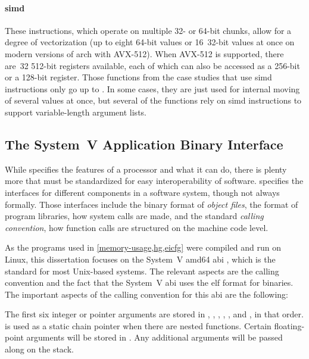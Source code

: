 \paragraph{\Acf{simd}}
These instructions, which operate on multiple 32- or 64-bit chunks,
allow for a degree of vectorization (up to eight 64-bit values
or 16~32-bit values at once on modern versions of \gls{arch} with AVX-512).
When AVX-512 is supported, there are~32 512-bit  registers available,
each of which can also be accessed as a 256-bit 
or a 128-bit  register.
Those functions from the case studies that use \ac{simd} instructions
only go up to . In some cases, they are just used for internal moving
of several values at once, but several of the functions rely on \ac{simd} instructions
to support variable-length argument lists.

\subsection{The System~V  Application Binary Interface}
While  specifies the features of a processor and what it can do,
there is plenty more that must be standardized for easy interoperability of
software.  specifies the interfaces for different components
in a software system, though not always formally. Those interfaces include
the binary format of \emph{object files}, the format of program libraries,
how system calls are made, and the standard \emph{calling convention},
how function calls are structured on the machine code level.

As the programs used in \cref{memory-usage,hg,eicfg} were compiled and run on Linux,
this dissertation focuses on the System~V \gls{amd64} \ac{abi} \autocite{systemv-ABI-git},
which is the standard for most Unix-based systems.
The relevant aspects are the calling convention and the fact that the System~V \ac{abi} uses the \ac{elf} format for binaries.
The important aspects of the calling convention for this \ac{abi}
are the following:

The first six integer or pointer arguments are stored in ,
, , , ,
and , in that order.
 is used as a static chain pointer when there are nested functions.
Certain floating-point arguments will be stored in
. Any additional arguments will be passed along on the stack.

